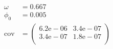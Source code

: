\begin{align}
	\omega &= 0.667 \\
	\phi_0 &= 0.005 \\
	\mathrm{cov} &=
	\begin{pmatrix}
		6.2\mathrm{e}-06 &3.4\mathrm{e}-07 \\
		3.4\mathrm{e}-07 &1.8\mathrm{e}-07 \\
	\end{pmatrix} 
\end{align}

